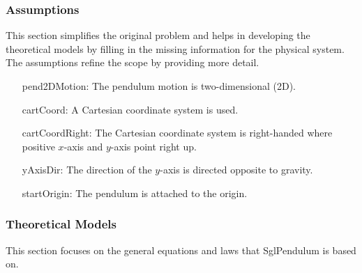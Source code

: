 \documentclass[12pt]{article}
\begin{document}
\subsubsection{Assumptions}
\label{Sec:Assumps}
This section simplifies the original problem and helps in developing the theoretical models by filling in the missing information for the physical system. The assumptions refine the scope by providing more detail.

\begin{itemize}
\item[pend2DMotion:\phantomsection\label{pend2DMotion}]{The pendulum motion is two-dimensional (2D).}
\item[cartCoord:\phantomsection\label{cartCoord}]{A Cartesian coordinate system is used.}
\item[cartCoordRight:\phantomsection\label{cartCoordRight}]{The Cartesian coordinate system is right-handed where positive $x$-axis and $y$-axis point right up.}
\item[yAxisDir:\phantomsection\label{yAxisDir}]{The direction of the $y$-axis is directed opposite to gravity.}
\item[startOrigin:\phantomsection\label{startOrigin}]{The pendulum is attached to the origin.}
\end{itemize}
\subsubsection{Theoretical Models}
\label{Sec:TMs}
This section focuses on the general equations and laws that SglPendulum is based on.
\end{document}
